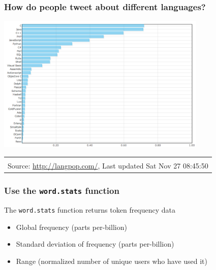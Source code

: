 \documentclass[xcolor=dvipsnames, 9pt,handout]{beamer}
\begin{document}
\begin{frame}[fragile]
    \frametitle{How do people tweet about different languages?}
    \begin{center}
        \includegraphics[width=10cm]{images/lang_pop.png}
    \end{center}
    \begin{tabular}{r}
        \hline \\
        \scriptsize{Source: \url{http://langpop.com/},  Last updated Sat Nov 27 08:45:50}
    \end{tabular}
\end{frame}

\begin{frame}[fragile]
    \frametitle{Use the \texttt{word.stats} function}
    The \texttt{word.stats} function returns token frequency data
    \begin{itemize}
        \item Global frequency (parts per-billion)
        \item Standard deviation of frequency (parts per-billion)
        \item Range (normalized number of unique users who have used it)
    \end{itemize}
\end{frame}
\end{document}
